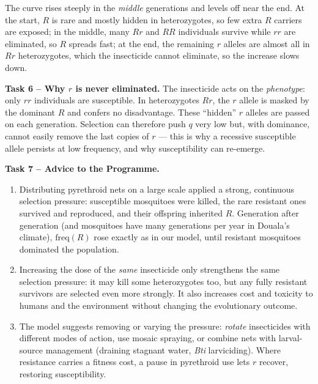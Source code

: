 \documentclass[11pt]{article}
\newcommand{\cle}[1]{{\popxbold\color{popdark}#1}}
\begin{document}
The curve rises steeply in the \emph{middle} generations and levels off near the end. At the start, $R$ is rare and mostly hidden in heterozygotes, so few extra $R$ carriers are exposed; in the middle, many $Rr$ and $RR$ individuals survive while $rr$ are eliminated, so $R$ spreads fast; at the end, the remaining $r$ alleles are almost all in $Rr$ heterozygotes, which the insecticide cannot eliminate, so the increase slows down.

\textbf{Task 6 -- Why $r$ is never eliminated.} The insecticide acts on the \emph{phenotype}: only $rr$ individuals are susceptible. In heterozygotes $Rr$, the $r$ allele is masked by the dominant $R$ and confers no disadvantage. These ``hidden'' $r$ alleles are passed on each generation. Selection can therefore push $q$ very low but, with dominance, cannot easily remove the last copies of $r$ --- this is why a recessive susceptible allele persists at low frequency, and why susceptibility can re-emerge.

\textbf{Task 7 -- Advice to the Programme.}
\begin{enumerate}
\item Distributing pyrethroid nets on a large scale applied a strong, continuous \cle{selection pressure}: susceptible mosquitoes were killed, the rare resistant ones survived and reproduced, and their offspring inherited $R$. Generation after generation (and mosquitoes have many generations per year in Douala's climate), $\mathrm{freq}(R)$ rose exactly as in our model, until resistant mosquitoes dominated the population.
\item Increasing the dose of the \emph{same} insecticide only strengthens the same selection pressure: it may kill some heterozygotes too, but any fully resistant survivors are selected even more strongly. It also increases cost and toxicity to humans and the environment without changing the evolutionary outcome.
\item The model suggests removing or varying the pressure: \emph{rotate} insecticides with different modes of action, use mosaic spraying, or combine nets with larval-source management (draining stagnant water, \emph{Bti} larviciding). Where resistance carries a fitness cost, a pause in pyrethroid use lets $r$ recover, restoring susceptibility.
\end{enumerate}
\end{document}

